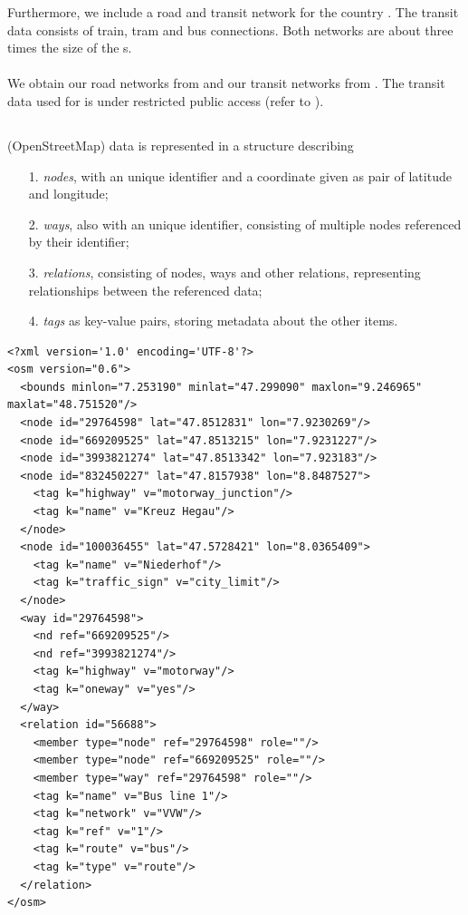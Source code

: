 	Furthermore, we include a road and transit network for the country \switzerlandR. The transit data consists of train, tram and
	bus connections. Both networks are about three times the size of the {\stuttgartR}s.\\\\
	We obtain our road networks from 
	and our transit networks from .
	The transit data used for \stuttgartR is under restricted public access (refer to ).

\subsection{\osm}
	\osm {} (OpenStreetMap) data is represented in a \xml structure describing
	\begin{itemize}
		\item[1.] \textit{nodes}, with an unique identifier and a coordinate given as pair of latitude and longitude;
		\item[2.] \textit{ways}, also with an unique identifier, consisting of multiple nodes referenced by their identifier;
		\item[3.] \textit{relations}, consisting of nodes, ways and other relations, representing relationships between the referenced data;
		\item[4.] \textit{tags} as key-value pairs, storing metadata about the other items.
	\end{itemize}
	\begin{lstlisting}[caption={\osm example data set, derived from \libref{osmExample}.},label={osmExample},style={XMLStyle},mathescape={true},
		float,floatplacement=ht]
<?xml version='1.0' encoding='UTF-8'?>
<osm version="0.6">
  <bounds minlon="7.253190" minlat="47.299090" maxlon="9.246965" maxlat="48.751520"/>
  <node id="29764598" lat="47.8512831" lon="7.9230269"/>
  <node id="669209525" lat="47.8513215" lon="7.9231227"/>
  <node id="3993821274" lat="47.8513342" lon="7.923183"/>
  <node id="832450227" lat="47.8157938" lon="8.8487527">
    <tag k="highway" v="motorway_junction"/>
    <tag k="name" v="Kreuz Hegau"/>
  </node>
  <node id="100036455" lat="47.5728421" lon="8.0365409">
    <tag k="name" v="Niederhof"/>
    <tag k="traffic_sign" v="city_limit"/>
  </node>
  <way id="29764598">
    <nd ref="669209525"/>
    <nd ref="3993821274"/>
    <tag k="highway" v="motorway"/>
    <tag k="oneway" v="yes"/>
  </way>
  <relation id="56688">
    <member type="node" ref="29764598" role=""/>
    <member type="node" ref="669209525" role=""/>
    <member type="way" ref="29764598" role=""/>
    <tag k="name" v="Bus line 1"/>
    <tag k="network" v="VVW"/>
    <tag k="ref" v="1"/>
    <tag k="route" v="bus"/>
    <tag k="type" v="route"/>
  </relation>
</osm>
	\end{lstlisting}\quad\\
